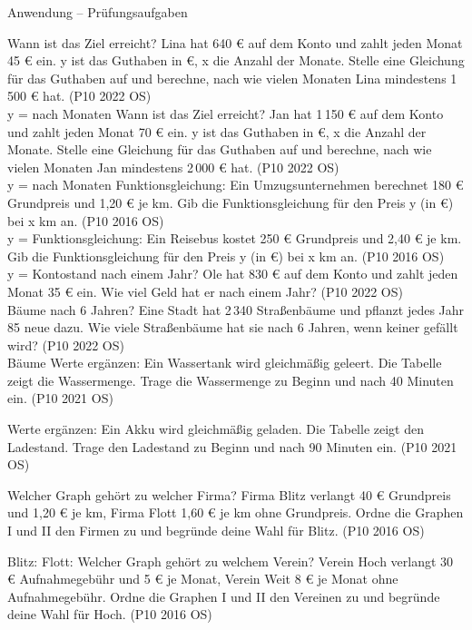 \begin{aufgabe}{Anwendung – Prüfungsaufgaben}
\begin{teile}
\steil Wann ist das Ziel erreicht? Lina hat 640 € auf dem Konto und zahlt jeden Monat 45 € ein. y ist das Guthaben in €, x die Anzahl der Monate. Stelle eine Gleichung für das Guthaben auf und berechne, nach wie vielen Monaten Lina mindestens 1\,500 € hat. \hfill (P10 2022 OS) \\ y = \leerfeld \quad nach \leerfeld Monaten
\steil Wann ist das Ziel erreicht? Jan hat 1\,150 € auf dem Konto und zahlt jeden Monat 70 € ein. y ist das Guthaben in €, x die Anzahl der Monate. Stelle eine Gleichung für das Guthaben auf und berechne, nach wie vielen Monaten Jan mindestens 2\,000 € hat. \hfill (P10 2022 OS) \\ y = \leerfeld \quad nach \leerfeld Monaten
\steil Funktionsgleichung: Ein Umzugsunternehmen berechnet 180 € Grundpreis und 1{,}20 € je km. Gib die Funktionsgleichung für den Preis y (in €) bei x km an. \hfill (P10 2016 OS) \\ y = \leerfeld
\steil Funktionsgleichung: Ein Reisebus kostet 250 € Grundpreis und 2{,}40 € je km. Gib die Funktionsgleichung für den Preis y (in €) bei x km an. \hfill (P10 2016 OS) \\ y = \leerfeld
\teil Kontostand nach einem Jahr? Ole hat 830 € auf dem Konto und zahlt jeden Monat 35 € ein. Wie viel Geld hat er nach einem Jahr? \hfill (P10 2022 OS) \\ \leerfeld[€]
\teil Bäume nach 6 Jahren? Eine Stadt hat 2\,340 Straßenbäume und pflanzt jedes Jahr 85 neue dazu. Wie viele Straßenbäume hat sie nach 6 Jahren, wenn keiner gefällt wird? \hfill (P10 2022 OS) \\ \leerfeld Bäume
\teil Werte ergänzen: Ein Wassertank wird gleichmäßig geleert. Die Tabelle zeigt die Wassermenge. Trage die Wassermenge zu Beginn und nach 40 Minuten ein. \hfill (P10 2021 OS)

\teil Werte ergänzen: Ein Akku wird gleichmäßig geladen. Die Tabelle zeigt den Ladestand. Trage den Ladestand zu Beginn und nach 90 Minuten ein. \hfill (P10 2021 OS)

\teil Welcher Graph gehört zu welcher Firma? Firma Blitz verlangt 40 € Grundpreis und 1{,}20 € je km, Firma Flott 1{,}60 € je km ohne Grundpreis. Ordne die Graphen I und II den Firmen zu und begründe deine Wahl für Blitz. \hfill (P10 2016 OS) \\

\begin{ksys}[xmin=0,xmax=150,ymin=0,ymax=250,xstep=25,ystep=50,xlabel=x in km,ylabel=y in €,ablesen]   \end{ksys}
Blitz: \leerfeld \quad Flott: \leerfeld
\teil Welcher Graph gehört zu welchem Verein? Verein Hoch verlangt 30 € Aufnahmegebühr und 5 € je Monat, Verein Weit 8 € je Monat ohne Aufnahmegebühr. Ordne die Graphen I und II den Vereinen zu und begründe deine Wahl für Hoch. \hfill (P10 2016 OS) \\


\end{teile}
\end{aufgabe}
